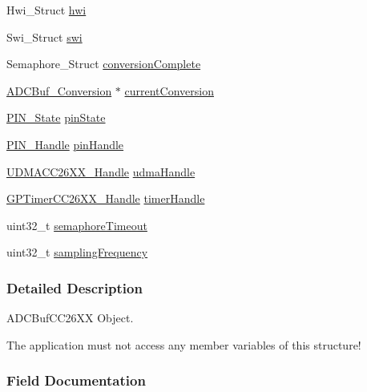 \begin{DoxyCompactItemize}
\item 
Hwi\+\_\+\+Struct \hyperlink{struct_a_d_c_buf_c_c26_x_x___object_a6b109fb12e69cb9217f6e38287ae2125}{hwi}
\item 
Swi\+\_\+\+Struct \hyperlink{struct_a_d_c_buf_c_c26_x_x___object_a823fcc4eb4b63030189e3b9703c31625}{swi}
\item 
Semaphore\+\_\+\+Struct \hyperlink{struct_a_d_c_buf_c_c26_x_x___object_a435becf6027488540d5e2ccf43af2899}{conversion\+Complete}
\item 
\hyperlink{struct_a_d_c_buf___conversion}{A\+D\+C\+Buf\+\_\+\+Conversion} $\ast$ \hyperlink{struct_a_d_c_buf_c_c26_x_x___object_ad7c49d6cc5ccdc3ac08f69c5468d016e}{current\+Conversion}
\item 
\hyperlink{_p_i_n_8h_a36ef69d50df6baa6973482669c24a522}{P\+I\+N\+\_\+\+State} \hyperlink{struct_a_d_c_buf_c_c26_x_x___object_ac383c8ebc0de85d10e61125268f71ff6}{pin\+State}
\item 
\hyperlink{_p_i_n_8h_afb2de52b054638f63c39df1f30a0d88d}{P\+I\+N\+\_\+\+Handle} \hyperlink{struct_a_d_c_buf_c_c26_x_x___object_a8c097d6aef35ff404e9db5914dd775cf}{pin\+Handle}
\item 
\hyperlink{_u_d_m_a_c_c26_x_x_8h_a969a9feb0f822c4764ef1da2ff5066cf}{U\+D\+M\+A\+C\+C26\+X\+X\+\_\+\+Handle} \hyperlink{struct_a_d_c_buf_c_c26_x_x___object_aa443c3cbecab5f1d0787baa0edb0c77e}{udma\+Handle}
\item 
\hyperlink{_g_p_timer_c_c26_x_x_8h_ab85403dde5940c587c57ca1a140e655a}{G\+P\+Timer\+C\+C26\+X\+X\+\_\+\+Handle} \hyperlink{struct_a_d_c_buf_c_c26_x_x___object_a90a6c596f446cb114269aceaab4c5a2e}{timer\+Handle}
\item 
uint32\+\_\+t \hyperlink{struct_a_d_c_buf_c_c26_x_x___object_a54deeefa0f97ca725d4234b7d8923721}{semaphore\+Timeout}
\item 
uint32\+\_\+t \hyperlink{struct_a_d_c_buf_c_c26_x_x___object_aa48daa7926823e87e732ea2bc4e70911}{sampling\+Frequency}
\end{DoxyCompactItemize}


\subsubsection{Detailed Description}
A\+D\+C\+Buf\+C\+C26\+X\+X Object. 

The application must not access any member variables of this structure! 

\subsubsection{Field Documentation}
